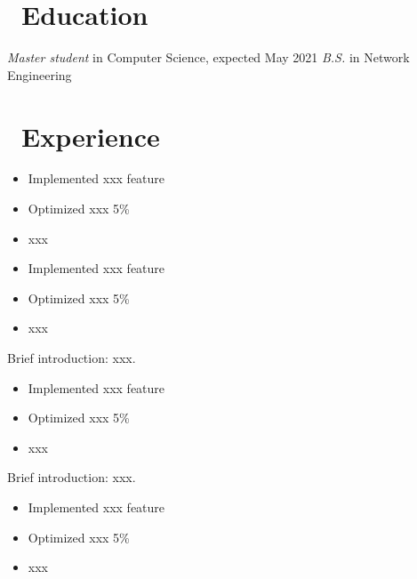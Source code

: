 \documentclass{resume}
\begin{document}



\section{\faGraduationCap\ Education}
\textit{Master student} in Computer Science, expected May 2021
\textit{B.S.} in Network Engineering

\section{\faUsers\ Experience}
\begin{itemize}
  \item Implemented xxx feature
  \item Optimized xxx 5\%
  \item xxx
\end{itemize}

\begin{itemize}
  \item Implemented xxx feature
  \item Optimized xxx 5\%
  \item xxx
\end{itemize}

Brief introduction: xxx.
\begin{itemize}
  \item Implemented xxx feature
  \item Optimized xxx 5\%
  \item xxx
\end{itemize}

Brief introduction: xxx.
\begin{itemize}
  \item Implemented xxx feature
  \item Optimized xxx 5\%
  \item xxx
\end{itemize}
\end{document}
